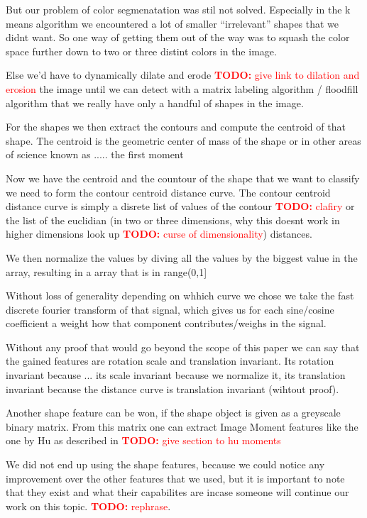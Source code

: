 \documentclass[journal]{vgtc}       %
\newcommand{\todo}[1]{\textcolor{red}{\textbf{TODO:} #1}}
\begin{document}
But our problem of color segmenatation was stil not solved. Especially in the k means algorithm we encountered a lot of smaller ``irrelevant'' shapes that we didnt want.
So one way of getting them out of the way was to squash the color space further down to two or three distint colors in the image.

Else we'd have to dynamically dilate and erode \todo{give link to dilation and erosion} the image until we can detect with a matrix labeling algorithm /  floodfill algorithm that we really have only a handful of shapes in the image.

For the shapes we then extract the contours and compute the centroid of that shape.
The centroid is the geometric center of mass of the shape or in other areas of science known as ..... the first moment 

Now we have the centroid and the countour of the shape that we want to classify we need to form the contour centroid distance curve.
The contour centroid distance curve is simply a disrete list of values of the contour \todo{clafiry} or the list of the euclidian (in two or three dimensions, why this doesnt work in higher dimensions look up \todo{curse of dimensionality}) distances.

We then normalize the values by diving all the values by the biggest value in the array, resulting in a array that is in range(0,1]

Without loss of generality depending on whhich curve we chose we take the fast discrete fourier transform of that signal, which gives us for each sine/cosine coefficient a weight how that component contributes/weighs in the signal.

Without any proof that would go beyond the scope of this paper we can say that the gained features are rotation scale and translation invariant. Its rotation invariant because ... its scale invariant because we normalize it, its translation invariant because the distance curve is translation invariant (wihtout proof).

Another shape feature can be won, if the shape object is given as a greyscale binary matrix. From this matrix one can extract Image Moment features like the one by Hu as described in \todo{give section to hu moments}

We did not end up using the shape features, because we could notice any improvement over the other features that we used, but it is important to note that they exist and what their capabilites are incase someone will continue our work on this topic. \todo{rephrase}.
\end{document}
